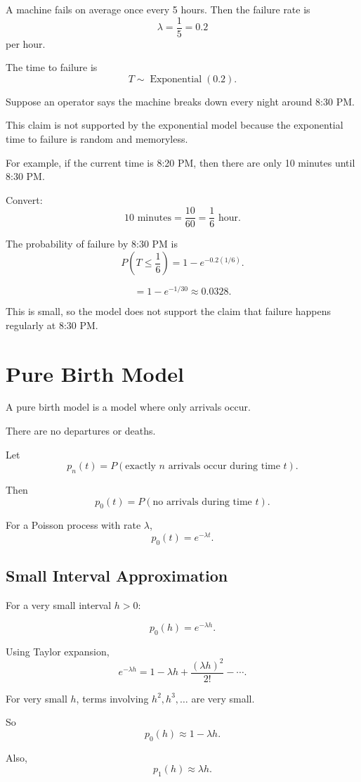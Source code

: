 \documentclass[12pt]{article}
\begin{document}
A machine fails on average once every 5 hours. Then the failure rate is
\[
\lambda=\frac{1}{5}=0.2
\]
per hour.

The time to failure is
\[
T\sim \operatorname{Exponential}(0.2).
\]

Suppose an operator says the machine breaks down every night around 8:30 PM.

This claim is not supported by the exponential model because the exponential time to failure is random and memoryless.

For example, if the current time is 8:20 PM, then there are only 10 minutes until 8:30 PM.

Convert:
\[
10\text{ minutes}=\frac{10}{60}=\frac16\text{ hour}.
\]

The probability of failure by 8:30 PM is
\[
P\left(T\leq \frac16\right)
=
1-e^{-0.2(1/6)}.
\]

\[
=1-e^{-1/30}
\approx 0.0328.
\]

This is small, so the model does not support the claim that failure happens regularly at 8:30 PM.

\section{Pure Birth Model}

A pure birth model is a model where only arrivals occur.

There are no departures or deaths.

Let
\[
p_n(t)=P(\text{exactly }n\text{ arrivals occur during time }t).
\]

Then
\[
p_0(t)=P(\text{no arrivals during time }t).
\]

For a Poisson process with rate \(\lambda\),
\[
p_0(t)=e^{-\lambda t}.
\]

\subsection*{Small Interval Approximation}

For a very small interval \(h>0\):

\[
p_0(h)=e^{-\lambda h}.
\]

Using Taylor expansion,
\[
e^{-\lambda h}
=
1-\lambda h+\frac{(\lambda h)^2}{2!}-\cdots.
\]

For very small \(h\), terms involving \(h^2,h^3,\ldots\) are very small.

So
\[
p_0(h)\approx 1-\lambda h.
\]

Also,
\[
p_1(h)\approx \lambda h.
\]
\end{document}
